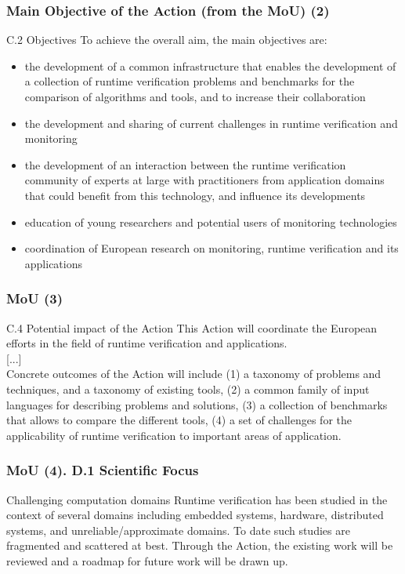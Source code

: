 \documentclass{beamer}
\begin{document}
\begin{frame}
  \frametitle{Main Objective of the Action (from the MoU) (2)}

\begin{block}{C.2 Objectives}
\small
To achieve the overall aim, the main objectives are:
\begin{itemize}
\item the development of a common infrastructure that enables the
  development of a collection of runtime verification problems and
  benchmarks for the comparison of algorithms and tools, and to
  increase their collaboration
\item \alert{the development and sharing of current challenges in runtime
  verification and monitoring}
\item the development of an interaction between the runtime
  verification community of experts at large with practitioners from
  application domains that could benefit from this technology, and
  influence its developments
\item education of young researchers and potential users of monitoring technologies
\item coordination of European research on monitoring, runtime
  verification and its applications
\end{itemize}
\end{block}
\end{frame}

\begin{frame}
\frametitle{MoU (3)}
\begin{block}{C.4 Potential impact of the Action}
  This Action will coordinate the European efforts in the field of
  runtime verification and applications.\\[1em]

  [...]\\[1em]

  Concrete outcomes of the Action will include (1) a taxonomy of
  problems and techniques, and a taxonomy of existing tools, (2) a
  common family of input languages for describing problems and
  solutions, (3) a collection of benchmarks that allows to compare the
  different tools, (4) \alert{a set of challenges for the
    applicability of runtime verification to important areas of
    application.}
\end{block}
\vfill

\end{frame}

\begin{frame}
\frametitle{MoU (4). D.1 Scientific Focus}

\begin{block}{Challenging computation domains}
  Runtime verification has been studied in the context of several
  domains including embedded systems, hardware, distributed systems,
  and unreliable/approximate domains. To date such studies are
  fragmented and scattered at best. Through the Action, the existing
  work will be reviewed and a roadmap for future work will be drawn
  up.
\end{block}

\end{frame}
\end{document}
